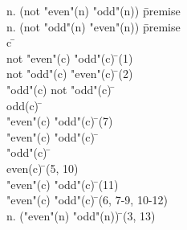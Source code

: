 \documentclass{article}
\begin{document}
\begin{proofbox}
\: \forall n. (not "even"(n) \rightarrow "odd"(n)) \= \hbox{premise} \\
\: \forall n. (not "odd"(n) \rightarrow "even"(n)) \= \hbox{premise} \\
\open
\: c \= \forallintroconst \\
\: not "even"(c) \rightarrow "odd"(c) \= \forallelim(1) \\
\: not "odd"(c) \rightarrow "even"(c) \= \forallelim(2) \\
\: "odd"(c) \lor not "odd"(c) \= \lem \\
\openAlt
\: odd(c) \= \asm \\
\: "even"(c) \lor "odd"(c) \= \orintro(7) \\
\: "even"(c) \lor "odd"(c) \=  \\
\splitAlt
\: \lnot "odd"(c) \= \asm \\
\: even(c) \= \implieselim(5, 10) \\
\: "even"(c) \lor "odd"(c) \= \orintro(11) \\
\closeAlt
\: "even"(c) \lor "odd"(c) \= \orelim(6, 7-9, 10-12) \\
\close
\: \forall n. ("even"(n) \lor "odd"(n)) \= \forallintro(3, 13) \\
\end{proofbox}
\end{document}
